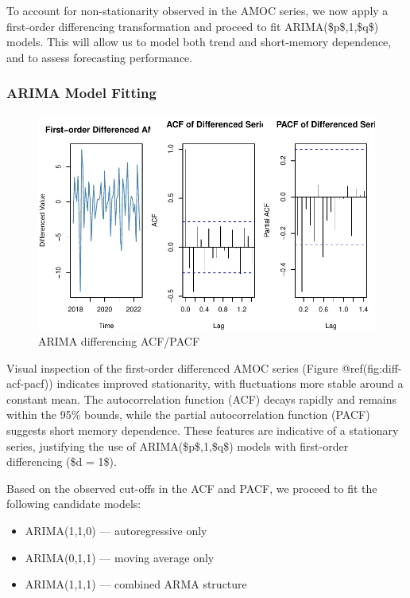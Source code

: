 \documentclass[
  11pt,
]{article}
\begin{document}
To account for non-stationarity observed in the AMOC series, we now
apply a first-order differencing transformation and proceed to fit
ARIMA(\$p\$,1,\$q\$) models. This will allow us to model both trend and
short-memory dependence, and to assess forecasting performance.

\subsubsection{ARIMA Model Fitting}\label{arima-model-fitting}

\begin{figure}[H]

{\centering \includegraphics{project_files/figure-pdf/fig-diff-acf-pacf-1.pdf}

}

\caption{ARIMA differencing ACF/PACF}

\end{figure}%

Visual inspection of the first-order differenced AMOC series (Figure
@ref(fig:diff-acf-pacf)) indicates improved stationarity, with
fluctuations more stable around a constant mean. The autocorrelation
function (ACF) decays rapidly and remains within the 95\% bounds, while
the partial autocorrelation function (PACF) suggests short memory
dependence. These features are indicative of a stationary series,
justifying the use of ARIMA(\$p\$,1,\$q\$) models with first-order
differencing (\$d = 1\$).

Based on the observed cut-offs in the ACF and PACF, we proceed to fit
the following candidate models:

\begin{itemize}
\item
  ARIMA(1,1,0) --- autoregressive only
\item
  ARIMA(0,1,1) --- moving average only
\item
  ARIMA(1,1,1) --- combined ARMA structure
\end{itemize}
\end{document}
